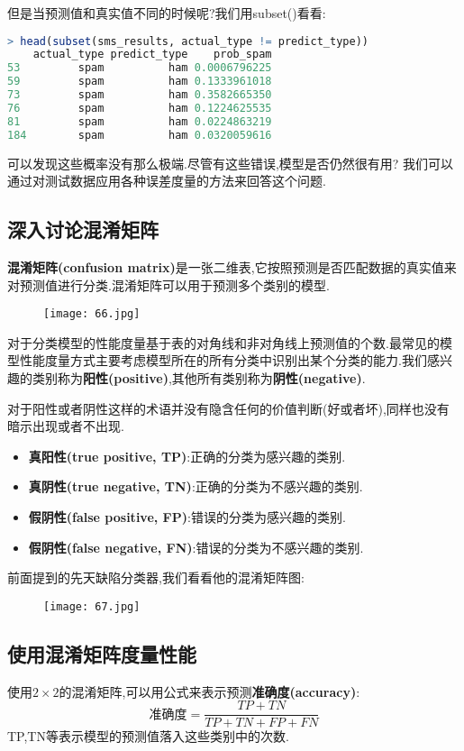 \documentclass[11pt,a4paper,oneside]{book}
\begin{document}
但是当预测值和真实值不同的时候呢?我们用subset()看看:
\begin{lstlisting}[language=r]
> head(subset(sms_results, actual_type != predict_type))
    actual_type predict_type    prob_spam
53         spam          ham 0.0006796225
59         spam          ham 0.1333961018
73         spam          ham 0.3582665350
76         spam          ham 0.1224625535
81         spam          ham 0.0224863219
184        spam          ham 0.0320059616
\end{lstlisting}
可以发现这些概率没有那么极端.尽管有这些错误,模型是否仍然很有用? 我们可以通过对测试数据应用各种误差度量的方法来回答这个问题.

\subsection{深入讨论混淆矩阵}
\textbf{混淆矩阵(confusion matrix)}是一张二维表,它按照预测是否匹配数据的真实值来对预测值进行分类.混淆矩阵可以用于预测多个类别的模型.

\begin{figure}[H]
	\centering
	\texttt{[image: 66.jpg]}
\end{figure}
对于分类模型的性能度量基于表的对角线和非对角线上预测值的个数.最常见的模型性能度量方式主要考虑模型所在的所有分类中识别出某个分类的能力.我们感兴趣的类别称为\textbf{阳性(positive)},其他所有类别称为\textbf{阴性(negative)}.

\begin{tcolorbox}[colback=pink!10!white,colframe=pink!100!black]
对于阳性或者阴性这样的术语并没有隐含任何的价值判断(好或者坏),同样也没有暗示出现或者不出现.
\end{tcolorbox}

\begin{itemize}
	\item \textbf{真阳性(true positive, TP)}:正确的分类为感兴趣的类别.
	\item \textbf{真阴性(true negative, TN)}:正确的分类为不感兴趣的类别.
	\item \textbf{假阴性(false positive, FP)}:错误的分类为感兴趣的类别.
	\item \textbf{假阴性(false negative, FN)}:错误的分类为不感兴趣的类别.
\end{itemize}
前面提到的先天缺陷分类器,我们看看他的混淆矩阵图:
\begin{figure}[H]
	\centering
	\texttt{[image: 67.jpg]}
\end{figure}

\subsection{使用混淆矩阵度量性能}
使用$ 2\times 2 $的混淆矩阵,可以用公式来表示预测\textbf{准确度(accuracy)}:
\begin{equation}
\mbox{准确度}=\frac{TP+TN}{TP+TN+FP+FN}
\end{equation}
TP,TN等表示模型的预测值落入这些类别中的次数.
\end{document}
